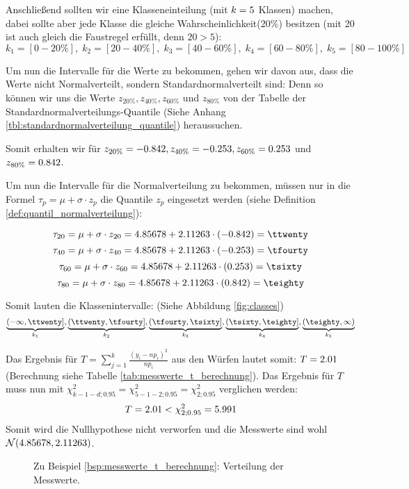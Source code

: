 {\begin{bsp}
    Anschließend sollten wir eine Klasseneinteilung (mit $k=\valk$ Klassen) machen, dabei sollte aber jede Klasse die gleiche Wahrscheinlichkeit($20\%$) besitzen (mit 20 ist auch gleich die Faustregel erfüllt, denn $20>5$):
    \[k_1=[0-20\%],\;k_2=[20-40\%],\;k_3=[40-60\%],\;k_4=[60-80\%],\;k_5=[80-100\%]\]

    Um nun die Intervalle für die Werte zu bekommen, gehen wir davon aus, dass die Werte nicht Normalverteilt, sondern Standardnormalverteilt sind:
    Denn so können wir uns die Werte $z_{20\%},z_{40\%},z_{60\%}$ und $z_{80\%}$ von der Tabelle der Standardnormalverteilungs-Quantile (Siehe Anhang \ref{tbl:standardnormalverteilung_quantile}) heraussuchen.

    Somit erhalten wir für $z_{20\%}=\varztwenty,z_{40\%}=\varzfourty,z_{60\%}=\varzsixty$ und ${z_{80\%}=\varzeighty}$.

    Um nun die Intervalle für die Normalverteilung zu bekommen, müssen nur in die Formel $\tau_p=\mu+\sigma\cdot z_p$ die Quantile $z_p$ eingesetzt werden (siehe Definition \ref{def:quantil_normalverteilung}):

    \[\tau_{20}=\mu+\sigma\cdot z_{20}=\valoverliney+\valvarianz\cdot(\varztwenty)=\ttwenty\]
    \[\tau_{40}=\mu+\sigma\cdot z_{40}=\valoverliney+\valvarianz\cdot(\varzfourty)=\tfourty\]
    \[\tau_{60}=\mu+\sigma\cdot z_{60}=\valoverliney+\valvarianz\cdot(\varzsixty)=\tsixty\]
    \[\tau_{80}=\mu+\sigma\cdot z_{80}=\valoverliney+\valvarianz\cdot(\varzeighty)=\teighty\]

    Somit lauten die Klassenintervalle: (Siehe Abbildung \ref{fig:classes})
    \[\underbrace{(-\infty,\ttwenty]}_{k_1},
    \underbrace{(\ttwenty,\tfourty]}_{k_2},
    \underbrace{(\tfourty,\tsixty]}_{k_3},
    \underbrace{(\tsixty,\teighty]}_{k_4},
    \underbrace{(\teighty,\infty)}_{k_5}\]

Das Ergebnis für $T=\sum_{j=1}^k\frac{(y_i-np_i)^2}{np_i}$ aus den Würfen lautet somit: $T=\tval$ (Berechnung siehe Tabelle \ref{tab:messwerte_t_berechnung}).
Das Ergebnis für $T$ muss nun mit $\chi_{k-1-d;0.95}^2=\chi_{5-1-2;0.95}^2=\chi_{2;0.95}^2$ verglichen werden:
\[T=\tval<\chi_{2;0.95}^2=5.991\]
Somit wird die Nullhypothese nicht verworfen und die Messwerte sind wohl \\$\mathcal N(\valoverliney, \valvarianz)$.
\end{bsp}

\begin{figure}
    \centering
    \begin{tikzpicture}
    \end{tikzpicture}
    \caption{Zu Beispiel \ref{bsp:messwerte_t_berechnung}: Verteilung der Messwerte.}
    \label{fig:normaldist_messwerte}
\end{figure}

}
